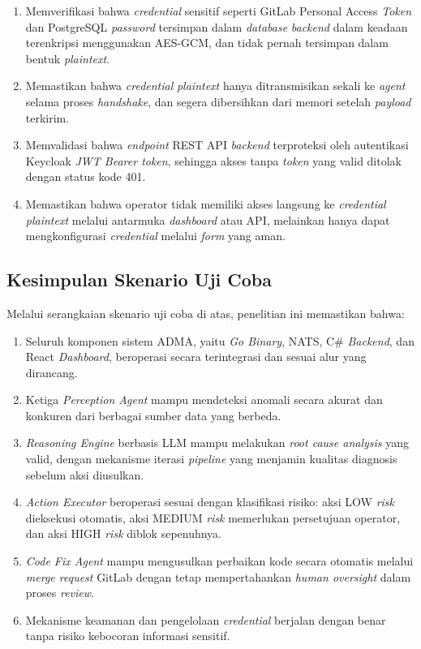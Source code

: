 \begin{enumerate}[label=\arabic*., leftmargin=*]
  \item Memverifikasi bahwa \textit{credential} sensitif seperti GitLab Personal Access \textit{Token} dan PostgreSQL \textit{password} tersimpan dalam \textit{database} \textit{backend} dalam keadaan terenkripsi menggunakan AES-GCM, dan tidak pernah tersimpan dalam bentuk \textit{plaintext}.
  \item Memastikan bahwa \textit{credential} \textit{plaintext} hanya ditransmisikan sekali ke \textit{agent} selama proses \textit{handshake}, dan segera dibersihkan dari memori setelah \textit{payload} terkirim.
  \item Memvalidasi bahwa \textit{endpoint} REST API \textit{backend} terproteksi oleh autentikasi Keycloak \textit{JWT Bearer token}, sehingga akses tanpa \textit{token} yang valid ditolak dengan status kode 401.
  \item Memastikan bahwa operator tidak memiliki akses langsung ke \textit{credential} \textit{plaintext} melalui antarmuka \textit{dashboard} atau API, melainkan hanya dapat mengkonfigurasi \textit{credential} melalui \textit{form} yang aman.
\end{enumerate}

\subsection{Kesimpulan Skenario Uji Coba}

Melalui serangkaian skenario uji coba di atas, penelitian ini memastikan bahwa:

\begin{enumerate}[label=\arabic*., leftmargin=*]
  \item Seluruh komponen sistem ADMA, yaitu \textit{Go Binary}, NATS, C\# \textit{Backend}, dan React \textit{Dashboard}, beroperasi secara terintegrasi dan sesuai alur yang dirancang.
  \item Ketiga \textit{Perception Agent} mampu mendeteksi anomali secara akurat dan konkuren dari berbagai sumber data yang berbeda.
  \item \textit{Reasoning Engine} berbasis LLM mampu melakukan \textit{root cause analysis} yang valid, dengan mekanisme iterasi \textit{pipeline} yang menjamin kualitas diagnosis sebelum aksi diusulkan.
  \item \textit{Action Executor} beroperasi sesuai dengan klasifikasi risiko: aksi LOW \textit{risk} dieksekusi otomatis, aksi MEDIUM \textit{risk} memerlukan persetujuan operator, dan aksi HIGH \textit{risk} diblok sepenuhnya.
  \item \textit{Code Fix Agent} mampu mengusulkan perbaikan kode secara otomatis melalui \textit{merge request} GitLab dengan tetap mempertahankan \textit{human oversight} dalam proses \textit{review}.
  \item Mekanisme keamanan dan pengelolaan \textit{credential} berjalan dengan benar tanpa risiko kebocoran informasi sensitif.
\end{enumerate}


